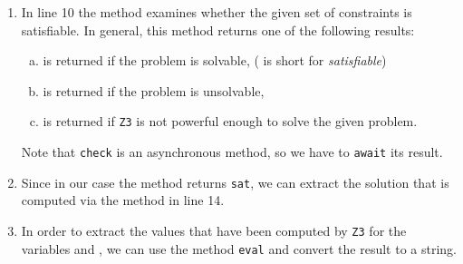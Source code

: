 \begin{enumerate}
      Unfortunately, \textsl{TypeScript} does not support operator overloading.  Therefore, we have to use the
      following methods:
      \begin{enumerate}[(a)]
      \item $x\texttt{.add}(y)$ computes $x + y$,
      \item $x\texttt{.sub}(y)$ computes $x - y$,
      \item $x\texttt{.mul}(y)$ computes $x * y$,
      \item $x\texttt{.div}(y)$ computes $x / y$,
      \item $x\texttt{.eq}(y)$ computes $x = y$,
      \item $x\texttt{.neq}(y)$ computes $x \not= y$,
      \item $x\texttt{.le}(y)$ computes $x \leq y$,
      \item $x\texttt{.ge}(y)$ computes $x \geq y$,
      \item $x\texttt{.lt}(y)$ computes $x < y$,
      \item $x\texttt{.gt}(y)$ computes $x > y$,
      \end{enumerate}
\item In line 10 the method  examines whether the given set of constraints is satisfiable.
      In general, this method returns one of the following results:
      \begin{enumerate}[(a)]
      \item {} is returned if the problem is solvable, ( is short for \emph{satisfiable})
      \item {} is returned if the problem is unsolvable,
      \item {} is returned if \texttt{Z3} is not powerful enough to solve the given problem.
      \end{enumerate}
      Note that \texttt{check} is an asynchronous method, so we have to \texttt{await} its result.
      
\item Since in our case the method  returns \texttt{sat}, we can extract the solution that is
      computed via the method  in line 14.  
\item In order to extract the values that have been computed by \texttt{Z3} for the variables  and
      , we can use the method \texttt{eval} and convert the result to a string.
\end{enumerate}
\pagebreak

